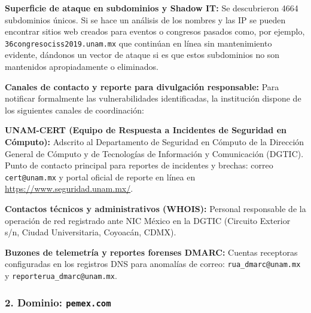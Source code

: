 \begin{itemizeColor}
    \item \textbf{Superficie de ataque en subdominios y Shadow IT:}
    Se descubrieron 4664 subdominios únicos. Si se hace un análisis de los nombres y las IP se pueden encontrar sitios web creados para eventos o congresos pasados como, por ejemplo, \texttt{36congresociss2019.unam.mx} que continúan en línea sin mantenimiento evidente, dándonos un vector de ataque si es que estos subdominios no son mantenidos apropiadamente o eliminados.

    \item \textbf{Canales de contacto y reporte para divulgación responsable:}
    Para notificar formalmente las vulnerabilidades identificadas, la institución dispone de los siguientes canales de coordinación:
    \begin{itemizeColor}
        \item \textbf{UNAM-CERT (Equipo de Respuesta a Incidentes de Seguridad en Cómputo):} Adscrito al Departamento de Seguridad en Cómputo de la Dirección General de Cómputo y de Tecnologías de Información y Comunicación (DGTIC). Punto de contacto principal para reportes de incidentes y brechas: correo \texttt{cert@unam.mx} y portal oficial de reporte en línea en \url{https://www.seguridad.unam.mx/}.
        \item \textbf{Contactos técnicos y administrativos (WHOIS):} Personal responsable de la operación de red registrado ante NIC México en la DGTIC (Circuito Exterior s/n, Ciudad Universitaria, Coyoacán, CDMX).
        \item \textbf{Buzones de telemetría y reportes forenses DMARC:} Cuentas receptoras configuradas en los registros DNS para anomalías de correo: \texttt{rua\_dmarc@unam.mx} y \texttt{reporterua\_dmarc@unam.mx}.
    \end{itemizeColor}
\end{itemizeColor}

\subsubsection*{2. Dominio: \texttt{pemex.com}}

